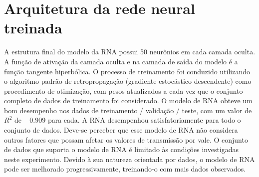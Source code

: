 

\section{Arquitetura da rede neural treinada}

A estrutura final do modelo da RNA possui 50 neurônios em cada camada oculta. A função de ativação da camada oculta e na camada de saída do modelo é a função tangente hiperbólica. O processo de treinamento foi conduzido utilizando o algoritmo padrão de retropropagação (gradiente estocástico descendente) como procedimento de otimização, com pesos atualizados a cada vez que o conjunto completo de dados de treinamento foi considerado.
O modelo de RNA obteve um bom desempenho nos dados de treinamento / validação / teste, com um valor de $R^2$ de ~ $0.909$ para cada. A RNA desempenhou satisfatoriamente para todo o conjunto de dados. Deve-se perceber que esse modelo de RNA não considera outros fatores que possam afetar os valores de transmissão por vale. O conjunto de dados que suporta o modelo de RNA é limitado às condições investigadas neste experimento. Devido à sua natureza orientada por dados, o modelo de RNA pode ser melhorado progressivamente, treinando-o com mais dados observados.

% 